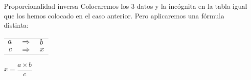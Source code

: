 \begin{infocard}{Proporcionalidad inversa}
    Colocaremos los 3 datos y la incógnita en la tabla igual que los hemos
    colocado en el caso anterior. Pero aplicaremos una fórmula distinta:
    \begin{center}
        \begin{tabular}{r>{\centering}p{0.2cm}l}
            $a$ & $\Rightarrow$ & $b$ \\
            $c$ & $\Rightarrow$ & $x$
        \end{tabular}\quad$x=\dfrac{a \times b}{c}$
    \end{center}
\end{infocard}
